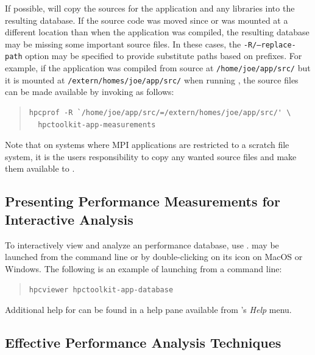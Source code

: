\documentclass[11pt,twoside,letterpaper]{report}
\begin{document}
If possible, \hpcprof{} will copy the sources for the application and any libraries into the resulting database.
If the source code was moved since or was mounted at a different location than when the application was compiled, the resulting database may be missing some important source files.
In these cases, the \texttt{-R/--replace-path} option may be specified to provide substitute paths based on prefixes.
For example, if the application was compiled from source at \texttt{/home/joe/app/src/} but it is mounted at \texttt{/extern/homes/joe/app/src/} when running \hpcprof{}, the source files can be made available by invoking \hpcprof{} as follows:
\begin{quote}
\begin{verbatim}
hpcprof -R `/home/joe/app/src/=/extern/homes/joe/app/src/' \
  hpctoolkit-app-measurements
\end{verbatim}
\end{quote}
Note that on systems where MPI applications are restricted to a scratch file system, it is the users responsibility to copy any wanted source files and make them available to \hpcprof{}.



\subsection{Presenting Performance Measurements for Interactive Analysis}

To interactively view and analyze an \HPCToolkit{} performance database, use \hpcviewer{}.
\hpcviewer{} may be launched from the command line or by double-clicking on its icon on MacOS or Windows.
The following is an example of launching from a command line:
\begin{quote}
  \verb|hpcviewer hpctoolkit-app-database|
\end{quote}
Additional help for \hpcviewer{} can be found in a help pane available from \hpcviewer{}'s \emph{Help} menu.


\subsection{Effective Performance Analysis Techniques}
\end{document}
